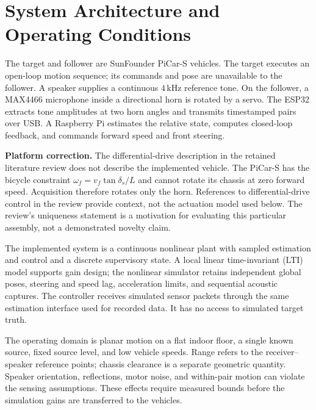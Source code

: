 \section{System Architecture and Operating Conditions}
\label{sec:system}
The target and follower are SunFounder PiCar-S vehicles. The target executes an open-loop motion sequence; its commands and pose are unavailable to the follower. A speaker supplies a continuous $4\,\mathrm{kHz}$ reference tone. On the follower, a MAX4466 microphone inside a directional horn is rotated by a servo. The ESP32 extracts tone amplitudes at two horn angles and transmits timestamped pairs over USB. A Raspberry Pi estimates the relative state, computes closed-loop feedback, and commands forward speed and front steering.

\textbf{Platform correction.} The differential-drive description in the retained literature review does not describe the implemented vehicle. The PiCar-S has the bicycle constraint $\omega_f=v_f\tan\delta_s/L$ and cannot rotate its chassis at zero forward speed. Acquisition therefore rotates only the horn. References to differential-drive control in the review provide context, not the actuation model used below. The review's uniqueness statement is a motivation for evaluating this particular assembly, not a demonstrated novelty claim.



The implemented system is a continuous nonlinear plant with sampled estimation and control and a discrete supervisory state. A local linear time-invariant (LTI) model supports gain design; the nonlinear simulator retains independent global poses, steering and speed lag, acceleration limits, and sequential acoustic captures. The controller receives simulated sensor packets through the same estimation interface used for recorded data. It has no access to simulated target truth.

The operating domain is planar motion on a flat indoor floor, a single known source, fixed source level, and low vehicle speeds. Range refers to the receiver--speaker reference points; chassis clearance is a separate geometric quantity. Speaker orientation, reflections, motor noise, and within-pair motion can violate the sensing assumptions. These effects require measured bounds before the simulation gains are transferred to the vehicles.

